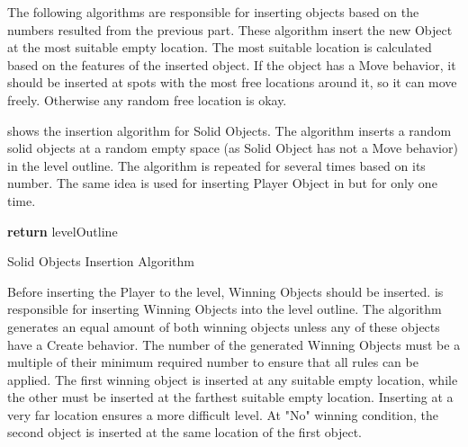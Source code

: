 The following algorithms are responsible for inserting objects based on the numbers resulted from the previous part. These algorithm insert the new Object at the most suitable empty location. The most suitable location is calculated based on the features of the inserted object. If the object has a Move behavior, it should be inserted at spots with the most free locations around it, so it can move freely. Otherwise any random free location is okay.\\\par

 shows the insertion algorithm for Solid Objects. The algorithm inserts a random solid objects at a random empty space (as Solid Object has not a Move behavior) in the level outline. The algorithm is repeated for several times based on its number. The same idea is used for inserting Player Object in  but for only one time.\\

\begin{algorithm}[H]
	\BlankLine
	\BlankLine
	\textbf{return} levelOutline\;
	\caption{Solid Objects Insertion Algorithm}
	\label{Algorithm:solidObjects}
\end{algorithm}

Before inserting the Player to the level, Winning Objects should be inserted.  is responsible for inserting Winning Objects into the level outline. The algorithm generates an equal amount of both winning objects unless any of these objects have a Create behavior. The number of the generated Winning Objects must be a multiple of their minimum required number to ensure that all rules can be applied. The first winning object is inserted at any suitable empty location, while the other must be inserted at the farthest suitable empty location. Inserting at a very far location ensures a more difficult level. At "No" winning condition, the second object is inserted at the same location of the first object.\\

